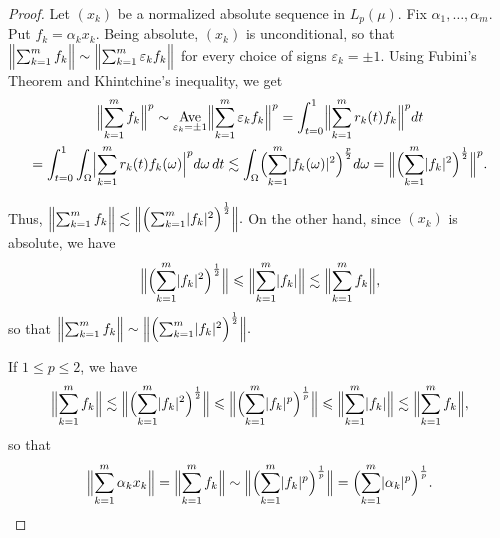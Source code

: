 \documentclass[12pt]{amsart}
\theoremstyle{plain}
\theoremstyle{definition}
\newcommand{\abs}[1]{\lvert#1\rvert}
\newcommand{\Bigabs}[1]{\Bigl\lvert#1\Bigr\rvert}
\newcommand{\Bignorm}[1]{\Bigl\lVert#1\Bigr\rVert}
\DeclareMathOperator*{\Ave}{Ave}
\renewcommand{\le}{\leqslant}
\begin{document}
\begin{proof}
  Let $(x_k)$ be a normalized absolute sequence in $L_p(\mu)$.  Fix
  $\alpha_1,\dots,\alpha_m$. Put $f_k=\alpha_kx_k$. Being absolute,
  $(x_k)$ is unconditional, so that
  \begin{math}
    \Bignorm{\sum_{k=1}^mf_k}\sim
        \Bignorm{\sum_{k=1}^m\varepsilon_kf_k}
  \end{math}
  for every choice of signs $\varepsilon_k=\pm 1$. Using Fubini's
  Theorem and Khintchine's inequality, we get
  \begin{multline*}
    \Bignorm{\sum_{k=1}^mf_k}^p\sim
    \Ave\limits_{\varepsilon_k=\pm 1}
    \Bignorm{\sum_{k=1}^m\varepsilon_kf_k}^p
    =\int_{t=0}^1\Bignorm{\sum_{k=1}^mr_k(t)f_k}^pdt\\
    =\int_{t=0}^1\int_\Omega\Bigabs{\sum_{k=1}^mr_k(t)
    f_k(\omega)}^pd\omega\,dt
    \lesssim\int_\Omega\Bigl(\sum_{k=1}^m\abs{f_k(\omega)}^2\Bigr)^{\frac{p}{2}}
    d\omega
    =\Bignorm{\Bigl(\sum_{k=1}^m\abs{f_k}^2\Bigr)^\frac12}^p.
  \end{multline*}
  
  Thus,
  \begin{math}
    \Bignorm{\sum_{k=1}^mf_k}\lesssim
    \Bignorm{\Bigl(\sum_{k=1}^m\abs{f_k}^2\Bigr)^\frac12}.
  \end{math}
  On the other hand, since $(x_k)$ is absolute, we have
  \begin{displaymath}
    \Bignorm{\Bigl(\sum_{k=1}^m\abs{f_k}^2\Bigr)^\frac12}
    \le\Bignorm{\sum_{k=1}^m\abs{f_k}}
    \lesssim\Bignorm{\sum_{k=1}^mf_k},
  \end{displaymath}
  so that
  \begin{math}
    \Bignorm{\sum_{k=1}^mf_k}\sim
    \Bignorm{\Bigl(\sum_{k=1}^m\abs{f_k}^2\Bigr)^\frac12}.
  \end{math}
  
  If $1\le p\le 2$, we have
  \begin{displaymath}
    \Bignorm{\sum_{k=1}^mf_k}\lesssim
    \Bignorm{\Bigl(\sum_{k=1}^m\abs{f_k}^2\Bigr)^\frac12}
    \le\Bignorm{\Bigl(\sum_{k=1}^m\abs{f_k}^p\Bigr)^\frac1p}
    \le\Bignorm{\sum_{k=1}^m\abs{f_k}}
    \lesssim\Bignorm{\sum_{k=1}^mf_k},    
  \end{displaymath}
  so that
  \begin{displaymath}
    \Bignorm{\sum_{k=1}^m\alpha_kx_k}
    =\Bignorm{\sum_{k=1}^mf_k}
    \sim\Bignorm{\Bigl(\sum_{k=1}^m\abs{f_k}^p\Bigr)^\frac1p}
    =\Bigl(\sum_{k=1}^m\abs{\alpha_k}^p\Bigr)^\frac1p.
  \end{displaymath}
  

\end{proof}
\end{document}
